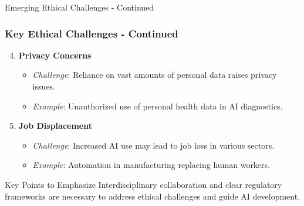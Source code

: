 \documentclass[aspectratio=169]{beamer}
\begin{document}
\begin{frame}[fragile]{Emerging Ethical Challenges - Continued}
    \frametitle{Key Ethical Challenges - Continued}
    \begin{enumerate}
        \setcounter{enumi}{3}
        \item \textbf{Privacy Concerns}
            \begin{itemize}
                \item \textit{Challenge}: Reliance on vast amounts of personal data raises privacy issues.
                \item \textit{Example}: Unauthorized use of personal health data in AI diagnostics.
            \end{itemize}

        \item \textbf{Job Displacement}
            \begin{itemize}
                \item \textit{Challenge}: Increased AI use may lead to job loss in various sectors.
                \item \textit{Example}: Automation in manufacturing replacing human workers.
            \end{itemize}
    \end{enumerate}
    
    \begin{block}{Key Points to Emphasize}
        Interdisciplinary collaboration and clear regulatory frameworks are necessary to address ethical challenges and guide AI development.
    \end{block}
\end{frame}
\end{document}
